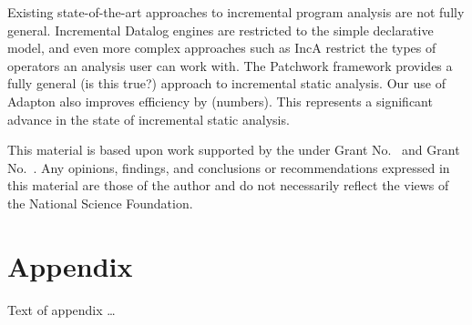 \documentclass[acmlarge,anonymous]{acmart}\settopmatter{printfolios=true}
\begin{document}
Existing state-of-the-art approaches to incremental program analysis are not fully general. Incremental Datalog engines are restricted to the simple declarative model, and even more complex approaches such as IncA restrict the types of operators an analysis user can work with. The Patchwork framework provides a fully general (is this true?) approach to incremental static analysis. Our use of Adapton also improves efficiency by (numbers). This represents a significant advance in the state of incremental static analysis.

\begin{acks}                            %
  This material is based upon work supported by the
   under Grant
  No.~ and Grant
  No.~.  Any opinions, findings, and
  conclusions or recommendations expressed in this material are those
  of the author and do not necessarily reflect the views of the
  National Science Foundation.
\end{acks}


%


\appendix
\section{Appendix}

Text of appendix \ldots
\end{document}
